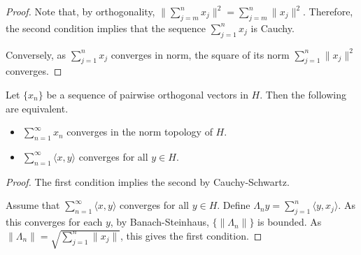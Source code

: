 \begin{proof}
  Note that, by orthogonality,
  $\|\sum_{j=m}^n x_j\|^2 = \sum_{j=m}^n \|x_j\|^2$.
  Therefore, the second condition implies that the sequence $\sum_{j=1}^n x_j$ is Cauchy.

  Conversely, as $\sum_{j=1}^n x_j$ converges in norm, the square of its norm $\sum_{j=1}^n \|x_j\|^2$ converges.
\end{proof}

\begin{lemma}
  \label{lem:sum_orthogonal'}
  Let $\{x_n\}$ be a sequence of pairwise orthogonal vectors in $H$.
  Then the following are equivalent.
  \begin{itemize}
    \item $\sum_{n=1}^\infty x_n$ converges in the norm topology of $H$.
    \item $\sum_{n=1}^\infty \langle x, y\rangle$ converges for all $y \in H$.
  \end{itemize}
\end{lemma}
\begin{proof}
  The first condition implies the second by Cauchy-Schwartz.

  Assume that
  $\sum_{n=1}^\infty \langle x, y\rangle$ converges for all $y \in H$.
  Define $\Lambda_n y = \sum_{j=1}^n \langle y, x_j\rangle$.
  As this converges for each $y$, by Banach-Steinhaus, $\{\|\Lambda_n\|\}$ is bounded.
  As $\|\Lambda_n\| = \sqrt{\sum_{j=1}^n \|x_j\|}$, this gives the first condition.
\end{proof}

